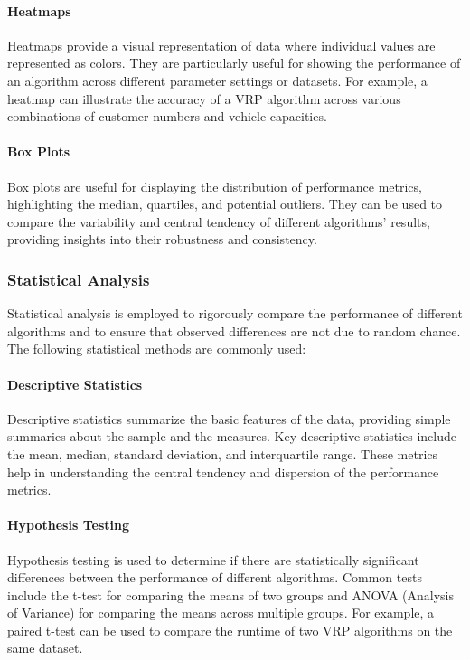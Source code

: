 \documentclass[
]{article}
\begin{document}
    \paragraph{Heatmaps}

    Heatmaps provide a visual representation of data where individual values are represented as colors. They are particularly useful for showing the performance of an algorithm across different parameter settings or datasets. For example, a heatmap can illustrate the accuracy of a VRP algorithm across various combinations of customer numbers and vehicle capacities.

    \paragraph{Box Plots}

    Box plots are useful for displaying the distribution of performance metrics, highlighting the median, quartiles, and potential outliers. They can be used to compare the variability and central tendency of different algorithms' results, providing insights into their robustness and consistency.

    \subsubsection{Statistical Analysis}

    Statistical analysis is employed to rigorously compare the performance of different algorithms and to ensure that observed differences are not due to random chance. The following statistical methods are commonly used:

    \paragraph{Descriptive Statistics}

    Descriptive statistics summarize the basic features of the data, providing simple summaries about the sample and the measures. Key descriptive statistics include the mean, median, standard deviation, and interquartile range. These metrics help in understanding the central tendency and dispersion of the performance metrics.

    \paragraph{Hypothesis Testing}

    Hypothesis testing is used to determine if there are statistically significant differences between the performance of different algorithms. Common tests include the t-test for comparing the means of two groups and ANOVA (Analysis of Variance) for comparing the means across multiple groups. For example, a paired t-test can be used to compare the runtime of two VRP algorithms on the same dataset.
\end{document}
